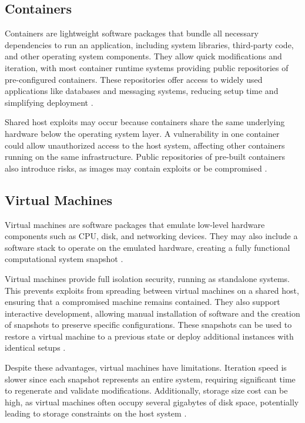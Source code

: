 \subsection{Containers}
Containers are lightweight software packages that bundle all necessary dependencies to run an application, including system libraries, third-party code, and other operating system components. They allow quick modifications and iteration, with most container runtime systems providing public repositories of pre-configured containers. These repositories offer access to widely used applications like databases and messaging systems, reducing setup time and simplifying deployment \Parencite{atlassian_containers_vs_vms}.

Shared host exploits may occur because containers share the same underlying hardware below the operating system layer. A vulnerability in one container could allow unauthorized access to the host system, affecting other containers running on the same infrastructure. Public repositories of pre-built containers also introduce risks, as images may contain exploits or be compromised \Parencite{atlassian_containers_vs_vms}.

\subsection{Virtual Machines}
Virtual machines are software packages that emulate low-level hardware components such as CPU, disk, and networking devices. They may also include a software stack to operate on the emulated hardware, creating a fully functional computational system snapshot \Parencite{atlassian_containers_vs_vms}.

Virtual machines provide full isolation security, running as standalone systems. This prevents exploits from spreading between virtual machines on a shared host, ensuring that a compromised machine remains contained. They also support interactive development, allowing manual installation of software and the creation of snapshots to preserve specific configurations. These snapshots can be used to restore a virtual machine to a previous state or deploy additional instances with identical setups \Parencite{atlassian_containers_vs_vms}.

Despite these advantages, virtual machines have limitations. Iteration speed is slower since each snapshot represents an entire system, requiring significant time to regenerate and validate modifications. Additionally, storage size cost can be high, as virtual machines often occupy several gigabytes of disk space, potentially leading to storage constraints on the host system \Parencite{atlassian_containers_vs_vms}.

